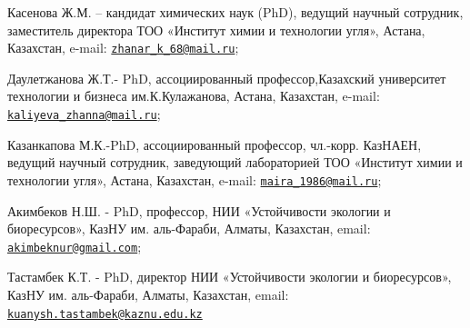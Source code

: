 \begin{authorinfo}
Касенова Ж.М. -- кандидат химических наук (PhD), ведущий научный
сотрудник, заместитель директора ТОО «Институт химии и технологии угля»,
Астана, Казахстан, e-mail:
\href{mailto:zhanar_k_68@mail.ru}{\nolinkurl{zhanar\_k\_68@mail.ru}};

Даулетжанова Ж.Т.- PhD, ассоциированный профессор,Казахский университет
технологии и бизнеса им.К.Кулажанова, Астана, Казахстан, e-mail:
\href{mailto:kaliyeva_zhanna@mail.ru}{\nolinkurl{kaliyeva\_zhanna@mail.ru}};

Казанкапова М.К.-PhD, ассоциированный профессор, чл.-корр. КазНАЕН,
ведущий научный сотрудник, заведующий лабораторией ТОО «Институт химии и
технологии угля», Астана, Казахстан, e-mail:
\href{mailto:maira_1986@mail.ru}{\nolinkurl{maira\_1986@mail.ru}};

Акимбеков Н.Ш. - PhD, профессор, НИИ «Устойчивости экологии и
биоресурсов», КазНУ им. аль-Фараби, Алматы, Казахстан, email:
\href{mailto:akimbeknur@gmail.com}{\nolinkurl{akimbeknur@gmail.com}};

Тастамбек К.Т. - PhD, директор НИИ «Устойчивости экологии и
биоресурсов», КазНУ им. аль-Фараби, Алматы, Казахстан, email:
\href{mailto:kuanysh.tastambek@kaznu.edu.kz}{\nolinkurl{kuanysh.tastambek@kaznu.edu.kz}}
\end{authorinfo}
